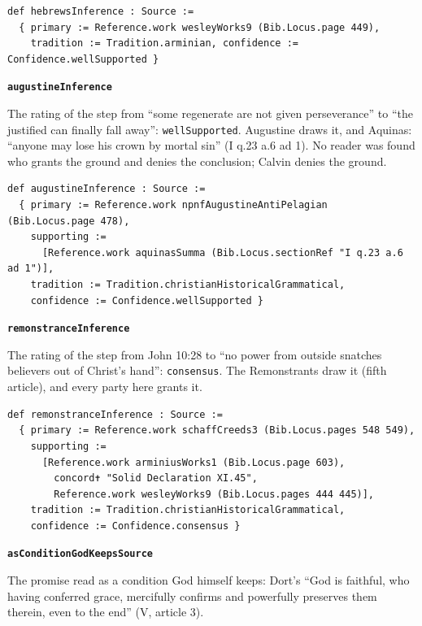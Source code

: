 \documentclass[11pt]{article}
\begin{document}
{\small\begin{verbatim}
def hebrewsInference : Source :=
  { primary := Reference.work wesleyWorks9 (Bib.Locus.page 449),
    tradition := Tradition.arminian, confidence := Confidence.wellSupported }
\end{verbatim}}
\par\medskip\noindent\textbf{\texttt{augustine\allowbreak{}Inference}}\par\nobreak\noindent
The rating of the step from “some regenerate are not given perseverance” to “the justified can finally fall away”: \texttt{well\allowbreak{}Supported}. Augustine draws it, and Aquinas: “anyone may lose his crown by mortal sin” (I q.23 a.6 ad 1). No reader was found who grants the ground and denies the conclusion; Calvin denies the ground.

{\small\begin{verbatim}
def augustineInference : Source :=
  { primary := Reference.work npnfAugustineAntiPelagian (Bib.Locus.page 478),
    supporting :=
      [Reference.work aquinasSumma (Bib.Locus.sectionRef "I q.23 a.6 ad 1")],
    tradition := Tradition.christianHistoricalGrammatical,
    confidence := Confidence.wellSupported }
\end{verbatim}}
\par\medskip\noindent\textbf{\texttt{remonstrance\allowbreak{}Inference}}\par\nobreak\noindent
The rating of the step from John 10:28 to “no power from outside snatches believers out of Christ’s hand”: \texttt{consensus}. The Remonstrants draw it (fifth article), and every party here grants it.

{\small\begin{verbatim}
def remonstranceInference : Source :=
  { primary := Reference.work schaffCreeds3 (Bib.Locus.pages 548 549),
    supporting :=
      [Reference.work arminiusWorks1 (Bib.Locus.page 603),
        concord✝ "Solid Declaration XI.45",
        Reference.work wesleyWorks9 (Bib.Locus.pages 444 445)],
    tradition := Tradition.christianHistoricalGrammatical,
    confidence := Confidence.consensus }
\end{verbatim}}
\par\medskip\noindent\textbf{\texttt{as\allowbreak{}Condition\allowbreak{}God\allowbreak{}Keeps\allowbreak{}Source}}\par\nobreak\noindent
The promise read as a condition God himself keeps: Dort’s “God is faithful, who having conferred grace, mercifully confirms and powerfully preserves them therein, even to the end” (V, article 3).
\end{document}

